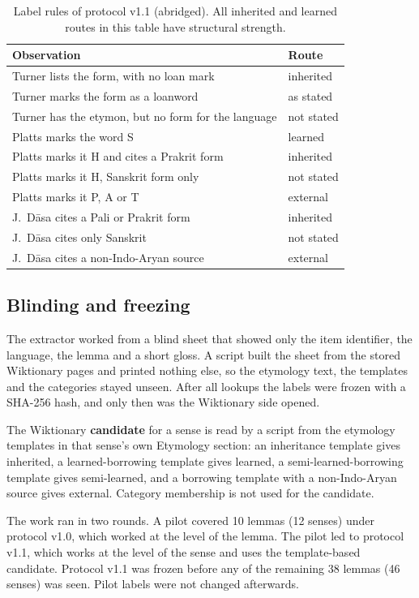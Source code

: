 \documentclass[11pt]{article}
\begin{document}
\begin{table}[t]
\centering\small
\begin{tabular}{p{}p{}}
\toprule
\textbf{Observation} & \textbf{Route} \\
\midrule
Turner lists the form, with no loan mark & inherited \\
Turner marks the form as a loanword & as stated \\
Turner has the etymon, but no form for the language & not stated \\
Platts marks the word S & learned \\
Platts marks it H and cites a Prakrit form & inherited \\
Platts marks it H, Sanskrit form only & not stated \\
Platts marks it P, A or T & external \\
J.~D\=asa cites a Pali or Prakrit form & inherited \\
J.~D\=asa cites only Sanskrit & not stated \\
J.~D\=asa cites a non-Indo-Aryan source & external \\
\bottomrule
\end{tabular}
\caption{Label rules of protocol v1.1 (abridged). All inherited and learned routes in this table have structural strength.}
\label{tab:rules}
\end{table}

\subsection{Blinding and freezing}

The extractor worked from a blind sheet that showed only the item identifier, the language, the lemma and a short gloss. A script built the sheet from the stored Wiktionary pages and printed nothing else, so the etymology text, the templates and the categories stayed unseen. After all lookups the labels were frozen with a SHA-256 hash, and only then was the Wiktionary side opened.

The Wiktionary \textbf{candidate} for a sense is read by a script from the etymology templates in that sense's own Etymology section: an inheritance template gives inherited, a learned-borrowing template gives learned, a semi-learned-borrowing template gives semi-learned, and a borrowing template with a non-Indo-Aryan source gives external. Category membership is not used for the candidate.

The work ran in two rounds. A pilot covered 10 lemmas (12 senses) under protocol v1.0, which worked at the level of the lemma. The pilot led to protocol v1.1, which works at the level of the sense and uses the template-based candidate. Protocol v1.1 was frozen before any of the remaining 38 lemmas (46 senses) was seen. Pilot labels were not changed afterwards.
\end{document}
